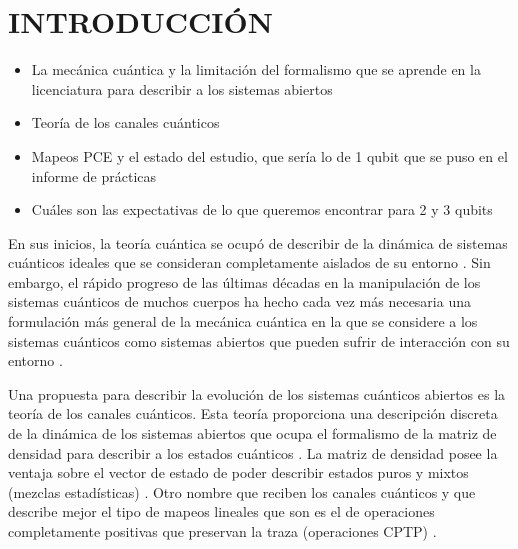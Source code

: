 \chapter{INTRODUCCIÓN}
\textcolor{mycolor}{
\begin{itemize}
\item La mecánica cuántica y la limitación del formalismo que se 
aprende en la licenciatura para describir a los sistemas abiertos
\item Teoría de los canales cuánticos
\item Mapeos PCE y el estado del estudio, que sería lo de 1
qubit que se puso en el informe de prácticas
\item Cuáles son las expectativas de lo que queremos encontrar 
para 2 y 3 qubits
\end{itemize}
}

En sus inicios, la teoría cuántica se ocupó de describir de la dinámica 
de sistemas cuánticos ideales que se consideran completamente aislados 
de su entorno \cite{feynman1965feyman}. Sin embargo, el rápido progreso
de las últimas décadas en la manipulación de los sistemas cuánticos de 
muchos cuerpos ha hecho cada vez más necesaria una formulación 
más general de la mecánica cuántica en la que se considere a 
los sistemas cuánticos como sistemas abiertos que pueden sufrir de 
interacción con su entorno \cite{preskill1998lecture}.

Una propuesta para describir la evolución de los sistemas cuánticos abiertos
es la teoría de los canales cuánticos. Esta teoría proporciona una descripción
discreta de la dinámica de los sistemas abiertos que ocupa el formalismo
de la matriz de densidad para describir a los estados cuánticos
\cite{nielsen_chuang_2011}. La matriz
de densidad posee la ventaja sobre el vector de estado de poder describir
estados puros y mixtos (mezclas estadísticas) \cite{sakurai_napolitano_2017}. 
Otro nombre que reciben 
los canales cuánticos y que describe mejor el tipo de mapeos lineales 
que son es el de operaciones completamente positivas que preservan la traza 
(operaciones CPTP) \cite{bengtsson_zyczkowski_2017}.\\

